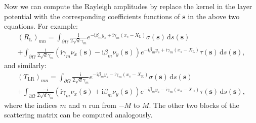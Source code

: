 \documentclass[11pt,fleqn]{article}
\newcommand{\ii}{\mathrm{i}}
\newcommand{\dd}{\mathrm{d}}
\theoremstyle{definition}
\theoremstyle{remark}
\begin{document}
Now we can compute the Rayleigh amplitudes by replace the kernel in the layer potential with the corresponding coefficients functions of $\mathbf{s}$ in the above two equations.
For example: \begin{multline}
(R_\mathrm{L})_{mn} = \int_{\partial \Omega} \frac{\ii}{2\sqrt{d}\gamma_m} e^{-\ii \beta_m y_s + \ii \gamma_m (x_s - X_\mathrm{L})} \sigma(\mathbf{s})\,\dd s(\mathbf{s}) \\
+ \int_{\partial \Omega} \frac{\ii}{2\sqrt{d}\gamma_m} (\ii \gamma_m \nu_x(\mathbf{s}) - \ii \beta_m \nu_y(\mathbf{s})) e^{-\ii \beta_m y_s + \ii \gamma_m (x_s - X_\mathrm{L})} \tau(\mathbf{s})\,\dd s(\mathbf{s}),
\end{multline}
and similarly:\begin{multline}
(T_{\mathrm{LR}})_{mn} = \int_{\partial \Omega} \frac{\ii}{2\sqrt{d}\gamma_m} e^{-\ii \beta_m y_s - \ii \gamma_m (x_s - X_\mathrm{R})} \sigma(\mathbf{s})\,\dd s(\mathbf{s}) \\
+ \int_{\partial \Omega} \frac{-\ii}{2\sqrt{d}\gamma_m} (\ii \gamma_m \nu_x(\mathbf{s}) + \ii \beta_m \nu_y(\mathbf{s})) e^{-\ii \beta_m y_s - \ii \gamma_m (x_s - X_\mathrm{R})} \tau(\mathbf{s})\,\dd s(\mathbf{s}),
\end{multline}
where the indices $m$ and $n$ run from $-M$ to $M$. The other two blocks of the scattering matrix can be computed analogously.
\end{document}
